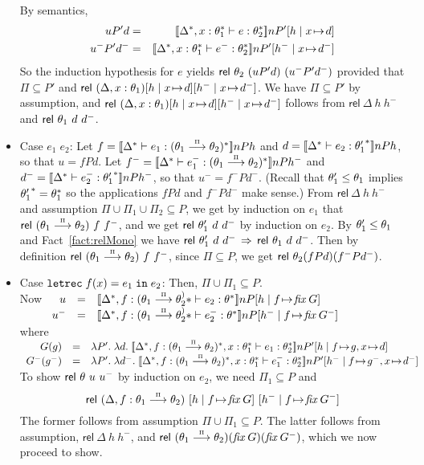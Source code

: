 \documentclass[submission,copyright,creativecommons]{eptcs}
\newcommand{\IN}{\mbox{\texttt{in}}}
\newcommand{\LET}{\mbox{\texttt{let}}}
\newcommand{\REC}{{\texttt{rec}}}
\newcommand{\ldb}{[\![}
\newcommand{\rdb}{]\!]}
\newcommand{\means}[1]{\ldb {#1}\rdb}
\newcommand{\union}{\cup}
\newcommand{\proves}{\vdash}
\newcommand{\ext}[3]{[#1\mid#2\!\mapsto\!#3]}
\newcommand{\recext}[5]{[#1\mid#2\!\mapsto\!#3,#4\!\mapsto\!#5]}
\newcommand{\lam}[2]{\lambda #1.\; #2} \newcommand{\all}[2]{\forall #1.\; #2}
\def\lpields#1{\stackrel{#1}{\longrightarrow}}
\newcommand{\annoto}[1]{\lpields {\scriptscriptstyle #1}}
\newcommand{\recdecl}[3]{\REC\;#1(#2) = #3}
\newcommand{\fix}{\textit{fix}}
\newcommand{\Rel}{\textsf{rel}}
\newcommand{\letdecl}[2]{\LET#1\;\IN\;#2}
\newcommand{\n}{n} \newcommand{\p}{p} \newcommand{\Ps}{\Pi} \newcommand{\h}{h}
\renewcommand{\implies}{\mathbin{\:\Rightarrow\:}}
\newenvironment{xproof}{\begin{trivlist}\item[\hskip\labelsep{\bf  
Proof:}]}{\end{trivlist}}
\begin{document}
\begin{xproof}
\begin{itemize}
By semantics, 
\begin{eqnarray*}
u P' d &=& 
\means{\Delta^*,x:\th_{1}^*\proves e:\th_{2}^*}\n P'\ext{\h}{x}{d}\\
u^- P' d^- &=& 
\means{\Delta^*,x:\th_{1}^*\proves e^-:\th_{2}^*}\n P'\ext{\h^-}{x}{d^-}
\end{eqnarray*}
So the induction hypothesis for $e$ yields $\Rel~\th_2~(u P' d)~(u^- P' d^-)$
provided that $\Ps\subseteq P'$ and $\Rel~ {(\Delta,x:\th_{1})}\ext{\h}{x}{d}
\ext{\h^-}{x}{d^-}$.
We have $\Ps\subseteq P'$ by assumption, and 
$\Rel~ {(\Delta,x:\th_{1})}\ext{\h}{x}{d}\ext{\h^-}{x}{d^-}$ follows from
$\Rel~ {\Delta}~\h~\h^-$ and $\Rel~ {\th_{1}}~d~d^-$.
\item Case $e_1\;e_2$:
Let $f=\means{\Delta^*\proves e_1:(\th_{1}\annoto{\Ps}\th_{2})^*}\n P \h$ and 
$d=\means{\Delta^*\proves e_2:{\th'_1}^*}\n P \h$, so that $u=f P d$.  
Let $f^-=\means{\Delta^*\proves e_1^-:(\th_{1}\annoto{\Ps}\th_{2})^*}\n P \h^-$
and $d^-=\means{\Delta^*\proves e_2^-:{\th'_1}^*}\n P \h^-$, so that 
$u^-=f^- P d^-$.  
(Recall that $\theta'_1\leq\theta_1$ implies ${\theta'_1}^*=\theta_{1}^*$ so the
applications $f P d$ and $f^-Pd^-$ make sense.)  From $\Rel~\Delta~\h~\h^-$ 
and assumption $\Ps\union\Ps_1\union\Ps_2\subseteq P$,  
we get by induction on $e_1$ that $\Rel~(\th_{1}\annoto{\Ps}\th_{2})~f~f^-$, 
and we get $\Rel~ {\th'_1}~d~d^-$ by induction on $e_2$. 
By $\theta'_1\leq \theta_1$ and Fact~\ref{fact:relMono} we have $\Rel~
{\th'_1}~d~d^-\implies \Rel~ {\th_1}~d~d^-$. 
Then by definition $\Rel~(\th_{1}\annoto{\Ps}\th_{2})~f~f^-$, since
$\Ps\subseteq P$, we get $\Rel~ {\th_2}(f P d)(f^-P d^-)$.
\item Case $\letdecl{\recdecl{f}{x}{e_1}}{e_2}$:
Then, $\Ps\union\Ps_1\subseteq P$.\\
Now 
\(\begin{array}[t]{rcl}
u&=&\means{\Delta^*,f:(\th_1\annoto{\Ps}\th_2^)*\proves e_2:\th^*}\n P \ext{\h}{f}{\fix\;G}\\
u^-&=&\means{\Delta^*,f:(\th_1\annoto{\Ps}\th_2^)*\proves e_2^-:\th^*}\n P \ext{\h^-}{f}{\fix\;G^-}
\end{array}\)
\\
where
\(\begin{array}[t]{rcl}
G(g)&=&
\lam{P'}
    {\lam{d}
         {\means{\Delta^*,f:(\th_1\annoto{\Ps}\th_2)^*,x:\th_1^*
                 \proves e_1:\th_2^*}\n P'\recext{\h}{f}{g}{x}{d}}}\\
G^-(g^-)&=&
\lam{P'}
    {\lam{d^-}
         {\means{\Delta^*,f:(\th_1\annoto{\Ps}\th_2)^*,x:\th_1^*
                 \proves e_1^-:\th_2^*}\n P'\recext{\h^-}{f}{g^-}{x}{d^-}}}
\end{array}\)
\\
To show $\Rel~ {\th}~u~u^-$ by induction on $e_2$, we need 
$\Ps_1\subseteq P$ and 
\[
\Rel~ {(\Delta,f:\th_1\annoto{\Ps}\th_2)}~\ext{\h}{f}{\fix\;G}~\ext{\h^-}{f}{\fix\;G^-} \] 
The former follows from assumption $\Ps\union\Ps_1\subseteq P$.
The latter follows from assumption, $\Rel~ {\Delta}~\h~\h^-$, and 
$\Rel~(\th_1\annoto{\Ps}\th_2)(\fix\;G)(\fix\;G^-)$, which we now proceed
to show.


\end{itemize}
\end{xproof}
\end{document}
